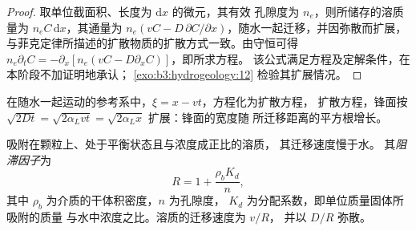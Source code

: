 \begin{proof}
取单位截面积、长度为 $\mathrm dx$ 的微元，其有效
孔隙度为 $n_e$，则所储存的溶质量为 $n_eC\,\mathrm dx$，其通量为
$n_e(vC - D\,\partial C/\partial x)$，随水一起迁移，并因弥散而扩展，
与菲克定律所描述的扩散物质的扩散方式一致。由守恒可得
$n_e\partial_tC = -\partial_x[n_e(vC - D\partial_xC)]$，即所求方程。
该公式满足方程及定解条件，在本阶段不加证明地承认；
\cref{exo:b3:hydrogeology:12} 检验其扩展情况。
\end{proof}

在随水一起运动的参考系中，$\xi = x - vt$，方程化为扩散方程，
扩散方程，锋面按 $\sqrt{2Dt} = \sqrt{2\alpha_L
vt} = \sqrt{2\alpha_Lx}$ 扩展：锋面的宽度随
所迁移距离的平方根增长。

\begin{definition}[阻滞因子]\label{def:b3:hydrogeology:retardation}
吸附在颗粒上、处于平衡状态且与浓度成正比的溶质，
其迁移速度慢于水。
其\emph{阻滞因子}为
\[
R = 1 + \frac{\rho_bK_d}{n} ,
\]
其中 $\rho_b$ 为介质的干体积密度，$n$ 为孔隙度，
$K_d$ 为分配系数，即单位质量固体所吸附的质量
与水中浓度之比。溶质的迁移速度为 $v/R$，
并以 $D/R$ 弥散。
\end{definition}

